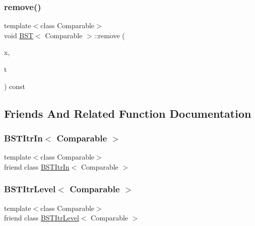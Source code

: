 \mbox{\label{classBST_afe360f55921ac51ac78ddde6556fe946}} 
\subsubsection{\texorpdfstring{remove()}{remove()}\hspace{0.1cm}{\footnotesize\ttfamily [2/2]}}
{\footnotesize\ttfamily template$<$class Comparable$>$ \\
void \hyperlink{classBST}{B\+ST}$<$ Comparable $>$\+::remove (\begin{DoxyParamCaption}\item[{const Comparable \&}]{x,  }\item[{\hyperlink{classBinaryNode}{Binary\+Node}$<$ Comparable $>$ $\ast$\&}]{t }\end{DoxyParamCaption}) const\hspace{0.3cm}{\ttfamily [private]}}



\subsection{Friends And Related Function Documentation}
\mbox{\label{classBST_aab3993acac2ab24a0b59edb0c3acc775}} 
\subsubsection{\texorpdfstring{B\+S\+T\+Itr\+In$<$ Comparable $>$}{BSTItrIn< Comparable >}}
{\footnotesize\ttfamily template$<$class Comparable$>$ \\
friend class \hyperlink{classBSTItrIn}{B\+S\+T\+Itr\+In}$<$ Comparable $>$\hspace{0.3cm}{\ttfamily [friend]}}

\mbox{\label{classBST_a26ff00bc0d87069aed877f10fd3c80a8}} 
\subsubsection{\texorpdfstring{B\+S\+T\+Itr\+Level$<$ Comparable $>$}{BSTItrLevel< Comparable >}}
{\footnotesize\ttfamily template$<$class Comparable$>$ \\
friend class \hyperlink{classBSTItrLevel}{B\+S\+T\+Itr\+Level}$<$ Comparable $>$\hspace{0.3cm}{\ttfamily [friend]}}

